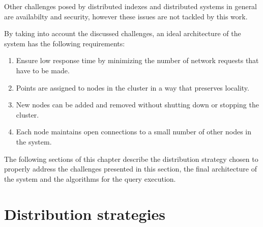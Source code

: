 \documentclass[11pt,a4paper]{globis-book}
\begin{document}
Other challenges posed by distributed indexes and distributed systems in general are availabilty and security, however these issues are not tackled by this work.

By taking into account the discussed challenges, an ideal architecture of the system has the following requirements:
\begin{enumerate}
    \item Ensure low response time by minimizing the number of network requests that have to be made.        
    \item Points are assigned to nodes in the cluster in a way that preserves locality.
    \item New nodes can be added and removed without shutting down or stopping the cluster.
    \item Each node maintains open connections to a small number of other nodes in the system.
\end{enumerate}

The following sections of this chapter describe the distribution strategy chosen to properly address the challenges presented in this section, the final architecture of the system and the algorithms for the query execution.

\section{Distribution strategies}
\label{sec:distindex-strategies}
\end{document}
